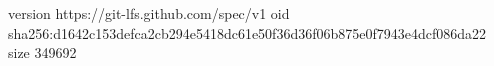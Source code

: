 version https://git-lfs.github.com/spec/v1
oid sha256:d1642c153defca2cb294e5418dc61e50f36d36f06b875e0f7943e4dcf086da22
size 349692
